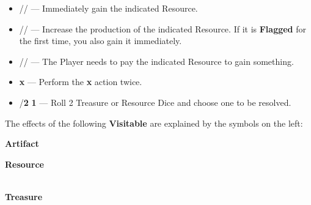 \begin{multicols*}{2}
\medskip

\begin{itemize}[itemsep=0.4em]
  \item [{\LARGE\textbf{+}}]
    // —
    Immediately gain the indicated Resource.
  \item [{}]
    // —
    Increase the production of the indicated Resource.
    If it is \textbf{Flagged} for the first time, you also gain it immediately.
  \item [{}]
    //  —
    The Player needs to pay the indicated Resource to gain something.
  \item [{\LARGE\textbf{2}}] {\LARGE\textbf{x}} —
    Perform the {\LARGE\textbf{x}} action twice.
  \item [{\LARGE\textbf{2}}] /{\LARGE\textbf{2}}  {\LARGE\textbf{1}} —
    Roll 2 Treasure or Resource Dice and choose one to be resolved.
\end{itemize}

\columnbreak


The effects of the following \textbf{Visitable}  are explained by the symbols on the left:

\medskip

{\centering
  \phantom{j}\textbf{Artifact}\\

  \bigskip

  \phantom{j}\textbf{Resource}\\
  \\

  \bigskip

  \phantom{j}\textbf{Treasure}\\
  \\
}
\end{multicols*}

